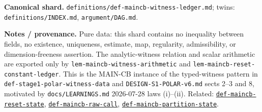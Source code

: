 \begin{defnote}
\par
\textbf{Canonical shard.} \texttt{definitions/\allowbreak{}def-\allowbreak{}maincb-\allowbreak{}witness-\allowbreak{}ledger.\allowbreak{}md}; twins: \texttt{definitions/INDEX.md}, \texttt{argument/DAG.md}.
\par
\textbf{Notes / provenance.} Pure data: this shard contains no inequality between fields, no existence, uniqueness, estimate, map, regularity, admissibility, or dimension-freeness assertion. The analytic-witness relation and scalar arithmetic are exported only by \texttt{lem-\allowbreak{}maincb-\allowbreak{}witness-\allowbreak{}arithmetic} and \texttt{lem-\allowbreak{}maincb-\allowbreak{}reset-\allowbreak{}constant-\allowbreak{}ledger}. This is the MAIN-CB instance of the typed-witness pattern in \texttt{def-\allowbreak{}stage1-\allowbreak{}polar-\allowbreak{}witness-\allowbreak{}data} and \texttt{DESIGN-\allowbreak{}S1-\allowbreak{}POLAR-\allowbreak{}v6.\allowbreak{}md} sects 2--3 and 8, motivated by \texttt{docs/\allowbreak{}LEARNINGS.\allowbreak{}md} 2026-07-28 laws (i)--(ii). Related: \hyperref[def:maincb-reset-state]{\texttt{def-\allowbreak{}maincb-\allowbreak{}reset-\allowbreak{}state}}, \hyperref[def:maincb-raw-call]{\texttt{def-\allowbreak{}maincb-\allowbreak{}raw-\allowbreak{}call}}, \hyperref[def:maincb-partition-state]{\texttt{def-\allowbreak{}maincb-\allowbreak{}partition-\allowbreak{}state}}.
\end{defnote}

